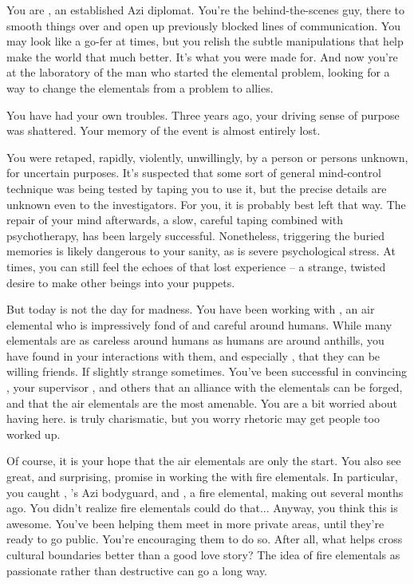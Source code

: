 \documentclass[char]{elementals}
\begin{document}
\name{\cDiplomat{}}

You are \cDiplomat{\intro}, an established Azi diplomat.  You're the behind-the-scenes guy, there to smooth things over and open up previously blocked lines of communication.  You may look like a go-fer at times, but you relish the subtle manipulations that help make the world that much better.  It's what you were made for.  And now you're at the laboratory of the man who started the elemental problem, looking for a way to change the elementals from a problem to allies.

You have had your own troubles.  Three years ago, your driving sense of purpose was shattered.  Your memory of the event is almost entirely lost.

You were retaped, rapidly, violently, unwillingly, by a person or persons unknown, for uncertain purposes.  It's suspected that some sort of general mind-control technique was being tested by taping you to use it, but the precise details are unknown even to the investigators.  For you, it is probably best left that way.  The repair of your mind afterwards, a slow, careful taping combined with psychotherapy, has been largely successful.  Nonetheless, triggering the buried memories is likely dangerous to your sanity, as is severe psychological stress.  At times, you can still feel the echoes of that lost experience -- a strange, twisted desire to make other beings into your puppets.

But today is not the day for madness.  You have been working with \cNaturalist{\intro}, an air elemental who is impressively fond of and careful around humans.  While many elementals are as careless around humans as humans are around anthills, you have found in your interactions with them, and especially \cNaturalist{}, that they can be willing friends.  If slightly strange sometimes.  You've been successful in convincing \cLeader{\intro}, your supervisor \cAvatar{\intro}, and others that an alliance with the elementals can be forged, and that the air elementals are the most amenable.  You are a bit worried about having \cDema{\intro} here.  \cDema{\They} is truly charismatic, but you worry \cDema{\their} rhetoric may get people too worked up.

Of course, it is your hope that the air elementals are only the start.  You also see great, and surprising, promise in working the with fire elementals.  In particular, you caught \cRomeo{\intro}, \cLeader{}'s Azi bodyguard, and \cJuliet{\intro}, a fire elemental, making out several months ago.  You didn't realize fire elementals could do that...  Anyway, you think this is awesome.  You've been helping them meet in more private areas, until they're ready to go public.  You're encouraging them to do so.  After all, what helps cross cultural boundaries better than a good love story?  The idea of fire elementals as passionate rather than destructive can go a long way.
\end{document}

